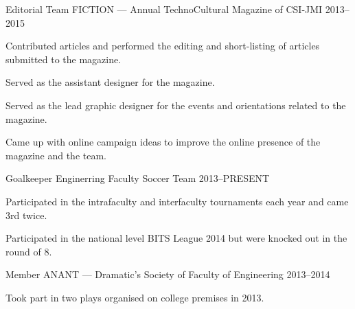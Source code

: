 \begin{cventries}
\cventry%
  {Editorial Team} %
  {FICTION --- Annual TechnoCultural Magazine of CSI-JMI} %
  {} %
  {2013--2015} %
  {%
    \begin{cvitems} %
      \item{Contributed articles and performed the editing and short-listing of
            articles submitted to the magazine.}
      \item{Served as the assistant designer for the magazine.}
      \item{Served as the lead graphic designer for the events and orientations
            related to the magazine.}
      \item{Came up with online campaign ideas to improve the online presence
            of the magazine and the team.}
    \end{cvitems}
  }

\cventry%
  {Goalkeeper} %
  {Enginerring Faculty Soccer Team} %
  {} %
  {2013--PRESENT} %
  {%
    \begin{cvitems} %
      \item{Participated in the intrafaculty and interfaculty tournaments each
            year and came 3rd twice.}
      \item{Participated in the national level BITS League 2014 but were
            knocked out in the round of 8.}
    \end{cvitems}
  }

\cventry%
  {Member} %
  {ANANT --- Dramatic's Society of Faculty of Engineering} %
  {} %
  {2013--2014} %
  {%
    \begin{cvitems} %
      \item{Took part in two plays organised on college premises in 2013.}
    \end{cvitems}
  }

\end{cventries}
